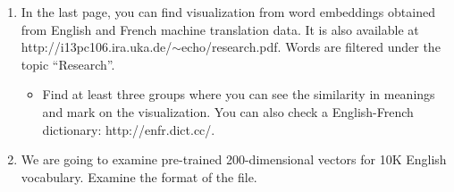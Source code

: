 \documentclass[12pt,fleqn]{article}
\begin{document}
\begin{enumerate}



\item In the last page, you can find visualization from word embeddings obtained from English and French machine translation data. It is also available at http://i13pc106.ira.uka.de/$\sim$echo/research.pdf. 
Words are filtered under the topic ``Research''. \\ 

\begin{itemize} 
 \item Find at least three groups where you can see the similarity in meanings and mark on the visualization. You can also check a English-French dictionary: http://enfr.dict.cc/. 
\end{itemize}

% 
% 



\item We are going to examine pre-trained 200-dimensional vectors for 10K English vocabulary.  
Examine the format of the file.  


\end{enumerate}
\end{document}
